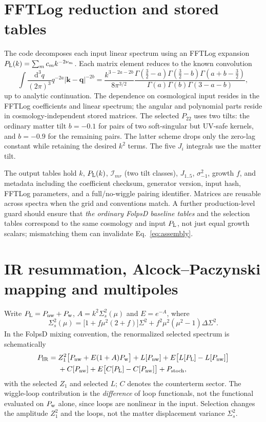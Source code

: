 \documentclass[11pt,a4paper]{article}
\newcommand{\dd}{\mathrm d}
\newcommand{\intq}{\int\!\frac{\dd^3 q}{(2\pi)^3}}
\newcommand{\Pl}{P_{\rm L}}
\newcommand{\bk}{\bm k}
\newcommand{\bq}{\bm q}
\newcommand{\wn}{\mathrm{nw}}
\newcommand{\sigs}{\sigma_{-1}^2}
\begin{document}
\section{FFTLog reduction and stored tables}
The code decomposes each input linear spectrum using an FFTLog expansion $\Pl(k)=\sum_m c_m k^{-2\nu_m}$. Each matrix element reduces to the known convolution
\begin{equation}\label{eq:fftlog}
 \intq q^{-2a}|\bk-\bq|^{-2b}=
 \frac{k^{3-2a-2b}}{8\pi^{3/2}}
 \frac{\Gamma(\tfrac32-a)\Gamma(\tfrac32-b)\Gamma(a+b-\tfrac32)}
 {\Gamma(a)\Gamma(b)\Gamma(3-a-b)},
\end{equation}
up to analytic continuation. The dependence on cosmological input resides in the FFTLog coefficients and linear spectrum; the angular and polynomial parts reside in cosmology-independent stored matrices. The selected $P_{22}$ uses two tilts: the ordinary matter tilt $b=-0.1$ for pairs of two soft-singular but UV-safe kernels, and $b=-0.9$ for the remaining pairs. The latter scheme drops only the zero-lag constant while retaining the desired $k^2$ terms. The five $J_i$ integrals use the matter tilt.

The output tables hold $k$, $\Pl(k)$, $\mathcal I_{mr}$ (two tilt classes), $J_{1..5}$, $\sigs$, growth $f$, and metadata including the coefficient checksum, generator version, input hash, FFTLog parameters, and a full/no-wiggle pairing identifier. Matrices are reusable across spectra when the grid and conventions match. A further production-level guard should ensure that \emph{the ordinary FolpsD baseline tables} and the selection tables correspond to the same cosmology and input $\Pl$, not just equal growth scalars; mismatching them can invalidate Eq.~\eqref{eq:assembly}.

\section{IR resummation, Alcock--Paczynski mapping and multipoles}
Write $\Pl=P_{\wn}+P_{\rm w}$, $A=k^2\Sigma_s^2(\mu)$ and $E=e^{-A}$, where
\begin{equation}
 \Sigma_s^2(\mu)=\big[1+f\mu^2(2+f)\big]\Sigma^2+f^2\mu^2(\mu^2-1)\Delta\Sigma^2.
\end{equation}
In the FolpsD mixing convention, the renormalized selected spectrum is schematically
\begin{align}\label{eq:ir}
 P_{\rm IR}={}&Z_1^2\big[P_{\wn}+E(1+A)P_{\rm w}\big]
 +L[P_{\wn}]+E\big[L[\Pl]-L[P_{\wn}]\big]\\
 &+C[P_{\wn}]+E\big[C[\Pl]-C[P_{\wn}]\big]+P_{\rm stoch},\nonumber
\end{align}
with the selected $Z_1$ and selected $L$; $C$ denotes the counterterm sector. The wiggle-loop contribution is the \emph{difference} of loop functionals, not the functional evaluated on $P_{\rm w}$ alone, since loops are nonlinear in the input. Selection changes the amplitude $Z_1^2$ and the loops, not the matter displacement variance $\Sigma_s^2$.
\end{document}
